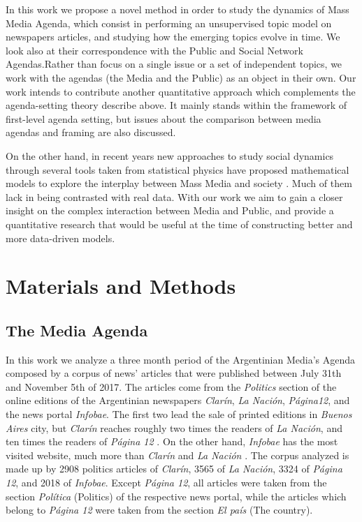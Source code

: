\documentclass{bmcart}
\begin{document}
\par In this work we propose a novel method in order to study the dynamics of Mass Media Agenda, which consist in performing an unsupervised topic model on newspapers articles, and studying how the emerging topics evolve in time. 
We look also at their correspondence with the Public and Social Network Agendas.Rather than focus on a single issue or a set of independent topics, we work with the agendas (the Media and the Public) as an object in their own.
Our work intends to contribute another quantitative approach which complements the agenda-setting theory describe above. It mainly stands within the framework of first-level agenda setting, but issues about the comparison between media agendas and framing are also discussed.
\par On the other hand, in recent years new approaches to study social dynamics through several tools taken from statistical physics have proposed mathematical models to explore the interplay between Mass Media and society \cite{crokidakis2012effects,gonzalez2012model, moussaid2013opinion, rodriguez2010effects, pinto2016setting}. Much of them lack in being contrasted with real data. 
With our work we aim to gain a closer insight on the complex interaction between Media and Public, and provide a quantitative research that would be useful at the time of constructing better and more data-driven models.

\section*{Materials and Methods}
 \label{sec:MatMeth}

\subsection*{The Media Agenda}
\par In this work we analyze a three month period of the Argentinian Media's Agenda composed by a corpus of news' articles that were published between July 31th and November 5th of 2017. 
The articles come from the \emph{Politics} section of the online editions of the Argentinian newspapers \emph{Clar\'in}, \emph{La Naci\'on}, \emph{P\'agina12}, and the news portal \emph{Infobae}. The first two lead the sale of printed editions in \emph{Buenos Aires} city, but \emph{Clar\'in} reaches roughly two times the readers of \emph{La Naci\'on}, and ten times the readers of \emph{P\'agina 12} \cite{IVC}. On the other hand, \emph{Infobae} has the most visited website, much more than \emph{Clar\'in} and \emph{La Naci\'on} \cite{AlexaAR}.
The corpus analyzed is made up by 2908 politics articles of \emph{Clar\'in}, 3565 of \emph{La Naci\'on}, 3324 of \emph{P\'agina 12}, and 2018 of \emph{Infobae}. Except \emph{P\'agina 12}, all articles were taken from the section \emph{Pol\'itica}  (Politics) of the respective news portal, while the articles which belong to \emph{P\'agina 12} were taken from the section \emph{El pa\'is} (The country).
\end{document}
